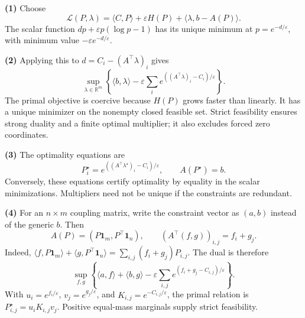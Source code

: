 \documentclass[11pt,a4paper]{article}
\theoremstyle{exostyle}
\newcommand{\R}{\mathbb{R}}
\begin{document}
\begin{solution}
\textbf{(1)} Choose
\[
\mathcal L(P,\lambda)=\langle C,P\rangle+\varepsilon H(P)+\langle\lambda,b-A(P)\rangle.
\]
The scalar function $dp+\varepsilon p(\log p-1)$ has its unique minimum at $p=e^{-d/\varepsilon}$, with minimum value $-\varepsilon e^{-d/\varepsilon}$.

\textbf{(2)} Applying this to $d=C_i-(A^\top\lambda)_i$ gives
\[
\sup_{\lambda\in\R^m}\left\{\langle b,\lambda\rangle
-\varepsilon\sum_i e^{((A^\top\lambda)_i-C_i)/\varepsilon}\right\}.
\]
The primal objective is coercive because $H(P)$ grows faster than linearly. It has a unique minimizer on the nonempty closed feasible set. Strict feasibility ensures strong duality and a finite optimal multiplier; it also excludes forced zero coordinates.

\textbf{(3)} The optimality equations are
\[
P_i^\star=e^{((A^\top\lambda^\star)_i-C_i)/\varepsilon},\qquad A(P^\star)=b.
\]
Conversely, these equations certify optimality by equality in the scalar minimizations. Multipliers need not be unique if the constraints are redundant.

\textbf{(4)} For an $n\times m$ coupling matrix, write the constraint vector as $(a,b)$ instead of the generic $b$. Then
\[
A(P)=(P\mathbf1_m,P^\top\mathbf1_n),\qquad
(A^\top(f,g))_{i,j}=f_i+g_j.
\]
Indeed, $\langle f,P\mathbf1_m\rangle+\langle g,P^\top\mathbf1_n\rangle=\sum_{i,j}(f_i+g_j)P_{i,j}$. The dual is therefore
\[
\sup_{f,g}\left\{\langle a,f\rangle+\langle b,g\rangle
-\varepsilon\sum_{i,j}e^{(f_i+g_j-C_{i,j})/\varepsilon}\right\}.
\]
With $u_i=e^{f_i/\varepsilon}$, $v_j=e^{g_j/\varepsilon}$, and $K_{i,j}=e^{-C_{i,j}/\varepsilon}$, the primal relation is $P_{i,j}^\star=u_iK_{i,j}v_j$. Positive equal-mass marginals supply strict feasibility.
\end{solution}
\end{document}
